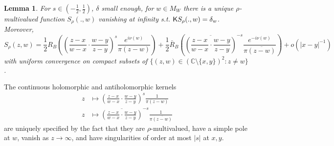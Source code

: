 \documentclass[10pt]{article}
\newcommand{\C}{\mathbb{C}}
\newcommand{\rK}{{\sf K}}
\newtheorem{Lem}[thm]{Lemma}
\begin{document}
\begin{Lem}\label{Lem:Srho2pts}
For $s\in (-\frac 12,\frac 12)$, $\delta$ small enough, for $w\in M_W$ there is a unique $\rho$-multivalued function $S_\rho(.,w)$ vanishing at infinity s.t. $\rK S_\rho(.,w)=\delta_w$. Moreover,
$$S_\rho(z,w)=\frac 12R_B\left(\left(\frac{z-x}{w-x}\cdot\frac{w-y}{z-y}\right)^s\frac{e^{i\nu(w)}}{\pi(z-w)}\right)
+\frac 12\bar R_B\left(\overline{\left(\frac{z-x}{w-x}\cdot\frac{w-y}{z-y}\right)}^{-s}\frac{e^{-i\nu(w)}}{\pi\overline{(z-w)}}\right)+o(|x-y|^{-1})$$
with uniform convergence on compact subsets of $\{(z,w)\in (\C\setminus\{x,y\})^2:z\neq w\}$.
\end{Lem}
The continuous holomorphic and antiholomorphic kernels 
\begin{align*}
z&\longmapsto\left(\frac{z-x}{w-x}\cdot\frac{w-y}{z-y}\right)^s\frac{1}{\pi(z-w)}\\
z&\longmapsto\overline{\left(\frac{z-x}{w-x}\cdot\frac{w-y}{z-y}\right)}^{-s}\frac{1}{\pi\overline{(z-w)}}
\end{align*}
are uniquely specified by the fact that they are $\rho$-multivalued, have a simple pole at $w$, vanish as $z\rightarrow\infty$, and have singularities of order at most $|s|$ at $x,y$. 
\end{document}

